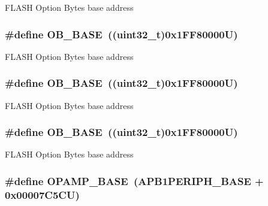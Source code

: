 F\-L\-A\-S\-H Option Bytes base address \hypertarget{group___peripheral__memory__map_gab5b5fb155f9ee15dfb6d757da1adc926}{
\subsubsection[{O\-B\-\_\-\-B\-A\-S\-E}]{\setlength{\rightskip}{0pt plus 5cm}\#define O\-B\-\_\-\-B\-A\-S\-E~((uint32\-\_\-t)0x1\-F\-F80000\-U)}}\label{group___peripheral__memory__map_gab5b5fb155f9ee15dfb6d757da1adc926}
F\-L\-A\-S\-H Option Bytes base address \hypertarget{group___peripheral__memory__map_gab5b5fb155f9ee15dfb6d757da1adc926}{
\subsubsection[{O\-B\-\_\-\-B\-A\-S\-E}]{\setlength{\rightskip}{0pt plus 5cm}\#define O\-B\-\_\-\-B\-A\-S\-E~((uint32\-\_\-t)0x1\-F\-F80000\-U)}}\label{group___peripheral__memory__map_gab5b5fb155f9ee15dfb6d757da1adc926}
F\-L\-A\-S\-H Option Bytes base address \hypertarget{group___peripheral__memory__map_gab5b5fb155f9ee15dfb6d757da1adc926}{
\subsubsection[{O\-B\-\_\-\-B\-A\-S\-E}]{\setlength{\rightskip}{0pt plus 5cm}\#define O\-B\-\_\-\-B\-A\-S\-E~((uint32\-\_\-t)0x1\-F\-F80000\-U)}}\label{group___peripheral__memory__map_gab5b5fb155f9ee15dfb6d757da1adc926}
F\-L\-A\-S\-H Option Bytes base address \hypertarget{group___peripheral__memory__map_ga6e9722d15c7ed794f0eca9682f64c03c}{
\subsubsection[{O\-P\-A\-M\-P\-\_\-\-B\-A\-S\-E}]{\setlength{\rightskip}{0pt plus 5cm}\#define O\-P\-A\-M\-P\-\_\-\-B\-A\-S\-E~(A\-P\-B1\-P\-E\-R\-I\-P\-H\-\_\-\-B\-A\-S\-E + 0x00007\-C5\-C\-U)}}\label{group___peripheral__memory__map_ga6e9722d15c7ed794f0eca9682f64c03c}
